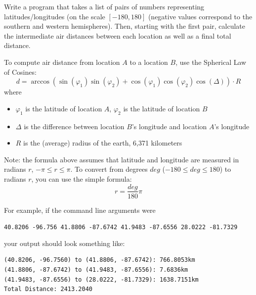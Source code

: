 \begin{exer}
Write a program that takes a list of pairs of numbers representing 
latitudes/longitudes (on the scale $[-180, 180]$ (negative values correspond to the
southern and western hemispheres).  Then, starting with the first
pair, calculate the intermediate air distances between each location as well as a 
final total distance.

To compute air distance from location $A$ to a location $B$, use the Spherical Law of Cosines:
 $$d = \arccos{(\sin(\varphi_1) \sin(\varphi_2) + \cos(\varphi_1) \cos(\varphi_2) \cos(\Delta) )} \cdot R$$
where
\begin{itemize}
  \item $\varphi_1$ is the latitude of location $A$, $\varphi_2$ is the latitude of location $B$
  \item $\Delta$ is the difference between location $B$'s longitude and location $A$'s longitude
  \item $R$ is the (average) radius of the earth, 6,371 kilometers
\end{itemize}
Note: the formula above assumes that latitude and longitude are measured in radians $r$, $-\pi \leq r \leq \pi$.  
To convert from degrees $deg$ ($-180 \leq deg \leq 180$) to radians $r$, you can use the simple formula:
  $$r = \frac{deg}{180} \pi$$

For example, if the command line arguments were 

\texttt{40.8206 -96.756 41.8806 -87.6742 41.9483 -87.6556 28.0222 -81.7329}

your output should look something like:

\begin{verbatim}
(40.8206, -96.7560) to (41.8806, -87.6742): 766.8053km
(41.8806, -87.6742) to (41.9483, -87.6556): 7.6836km
(41.9483, -87.6556) to (28.0222, -81.7329): 1638.7151km
Total Distance: 2413.2040
\end{verbatim}
\end{exer}

